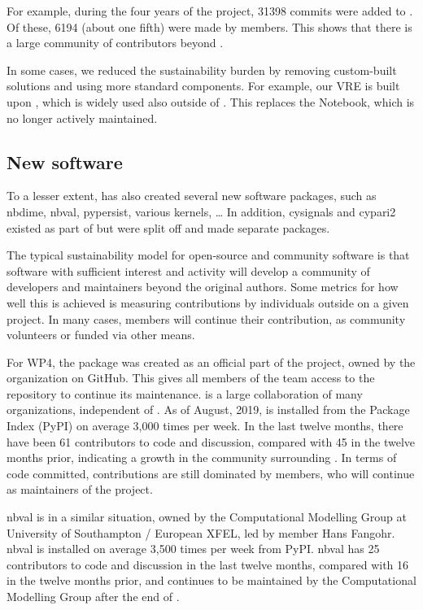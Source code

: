 \documentclass{deliverablereport}
\begin{document}
For example, during the four years of the \ODK project,
31398 commits were added to \Sage.
Of these, 6194
(about one fifth)  %
were made by \ODK members.
This shows that there is a large community of contributors beyond \ODK.

In some cases, we reduced the sustainability burden by removing
custom-built solutions and using more standard components.
For example, our VRE is built upon \Jupyter, which is widely used
also outside of \ODK.
This replaces the \Sage Notebook, which is no longer actively maintained.

\subsection{New software}

To a lesser extent,
\ODK has also created several new software packages,
such as nbdime, nbval, pypersist, various \Jupyter kernels, \ldots
In addition, cysignals and cypari2 existed as part of \Sage but were split
off and made separate packages.

The typical sustainability model for open-source and community software
is that software with sufficient interest and activity will develop
a community of developers and maintainers beyond the original authors.
Some metrics for how well this is achieved is measuring contributions
by individuals outside \ODK on a given project.
In many cases, \ODK members will continue their contribution,
as community volunteers or funded via other means.

For WP4, the \nbdime package was created as an official part of the \Jupyter project,
owned by the \Jupyter organization on GitHub.
This gives all members of the \Jupyter team access to the repository to continue its maintenance.
\Jupyter is a large collaboration of many organizations, independent of \ODK.
As of August, 2019, \nbdime is installed from the \Python Package Index (PyPI) on average 3,000 times per week.
In the last twelve months, there have been 61 contributors to code and discussion, compared with 45 in the twelve months prior,
indicating a growth in the community surrounding \nbdime.
In terms of code committed, contributions are still dominated by \ODK members,
who will continue as maintainers of the project.

nbval is in a similar situation,
owned by the Computational Modelling Group at University of Southampton / European XFEL,
led by \ODK member Hans Fangohr.
nbval is installed on average 3,500 times per week from PyPI.
nbval has 25 contributors to code and discussion in the last twelve months,
compared with 16 in the twelve months prior,
and continues to be maintained by the Computational Modelling Group after the end of \ODK.
\end{document}
